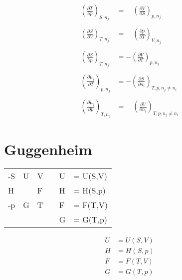 \documentclass[twocolumn]{article}
\begin{document}
\begin{align*}
	\left(\frac{\partial T}{\partial p}\right)_{S,n_j}
	&= \quad
	\left(\frac{\partial V}{\partial S}\right)_{p,n_j}
	\\\\
	\left(\frac{\partial S}{\partial V}\right)_{T,n_j}
	&= \quad
	\left(\frac{\partial p}{\partial T}\right)_{V,n_j}
	\\\\
	\left(\frac{\partial S}{\partial p}\right)_{T,n_j}
	&= -
	\left(\frac{\partial V}{\partial T}\right)_{p,n_j}
	\\\\
	\left(\frac{\partial \mu _i}{\partial T}\right)_{p,n_j}
	&= -
	\left(\frac{\partial S}{\partial n_i}\right)_{T,p,n_j \neq n_i}
	\\\\
	\left(\frac{\partial \mu_i}{\partial p}\right)_{T,n_j}
	&=
	\quad \left(\frac{\partial V}{\partial n_i}\right)_{T,p,n_j \neq n_i}
\end{align*}
\section{Guggenheim}
\Large
\begin{tabular}{llllll}
	-S  & U  & V&			&U &= U(S,V) \\ 
	H &  &  F&       &H &= H(S,p) \\
	-p & G & T                &      &F &= F(T,V) \\
	 &  &                      &     &G &= G(T,p) \\
\end{tabular}
\normalsize
\break
\begin{align*}
	U &= U(S,V) \\
	H &= H(S,p) \\
	F &= F(T,V) \\
	G &= G(T,p) \\
\end{align*}
\end{document}
